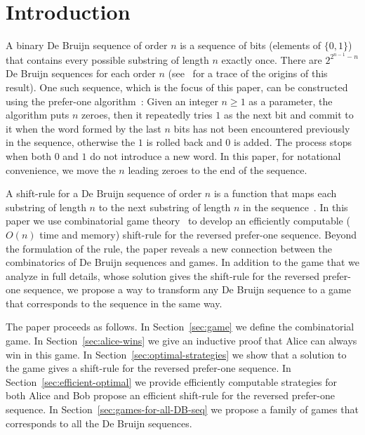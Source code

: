 \documentclass[final,12pt]{elsarticle}
\theoremstyle{definition} \newtheorem{definition}[theorem]{Definition} \newtheorem{observation}[theorem]{Observation} \newtheorem{example}[theorem]{Example} \newtheorem{remark}[theorem]{Remark} \newtheorem{corrolary}[theorem]{Corrolary}
\newcommand{\REF}[2]{#1~\ref{#2}}
\begin{document}
\section{Introduction}
\label{sec:introduction}

A binary De Bruijn sequence of order $n$ is a sequence of bits (elements of $\{0,1\}$) that contains every possible substring of length $n$ exactly once. There are $2^{2^{n-1}-n}$ De Bruijn sequences for each order $n$ (see~\cite{de1975acknowledgement} for a trace of the origins of this result). One such sequence, which is the focus of this paper, can be constructed using the prefer-one algorithm~\cite{Mar34}: Given an integer $n \geq 1$ as a parameter, the algorithm puts $n$ zeroes, then it repeatedly tries $1$ as the next bit and commit to it when the word formed by the last $n$ bits has not been encountered previously in the sequence, otherwise the $1$ is rolled back and $0$ is added. The process stops when both $0$ and $1$ do not introduce a new word. In this paper, for notational convenience, we move the $n$ leading zeroes to the end of the sequence.

A shift-rule for a De Bruijn sequence of order $n$ is a function that maps each substring of length $n$ to the next substring of length $n$ in the sequence~\cite{SAWADA2017524}. In this paper we use combinatorial game theory~\cite{berlekamp2003winning} to develop an efficiently computable ($O(n)$ time and memory) shift-rule for the reversed prefer-one sequence. Beyond the formulation of the rule, the paper reveals a new connection between the combinatorics of De Bruijn sequences and games. In addition to the game that we analyze in full details, whose solution gives the shift-rule for the reversed prefer-one sequence, we propose a way to transform any De Bruijn sequence to a game that corresponds to the sequence in the same way.

The paper proceeds as follows. In \REF{Section}{sec:game} we define the combinatorial game. In Section~\ref{sec:alice-wins} we give an inductive proof that Alice can always win in this game. In Section~\ref{sec:optimal-strategies} we show that a solution to the game gives a shift-rule for the reversed prefer-one sequence. In Section~\ref{sec:efficient-optimal} we provide efficiently computable strategies for both Alice and Bob propose an efficient shift-rule for the reversed prefer-one sequence. In Section~\ref{sec:games-for-all-DB-seq} we propose a family of games that corresponds to all the De Bruijn sequences.
\end{document}
